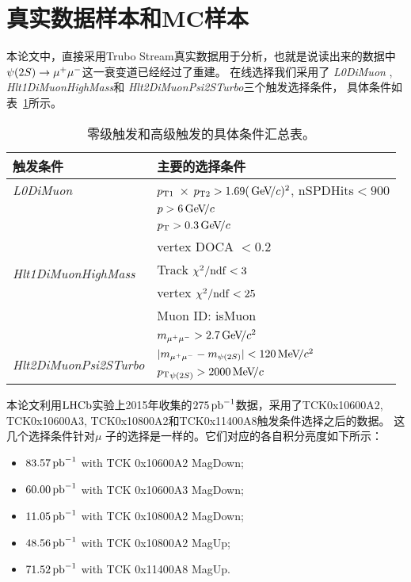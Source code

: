 \section{真实数据样本和MC样本}
本论文中，直接采用Trubo Stream真实数据用于分析，也就是说读出来的数据中${\psi{(2S)}} \rightarrow\mu^{+}\mu^{-}$这一衰变道已经经过了重建。
在线选择我们采用了 {\it L0DiMuon }, {\it Hlt1DiMuonHighMass}和 {\it Hlt2DiMuonPsi2STurbo}三个触发选择条件，
具体条件如表~\ref{tab:trgSummary}所示。
\begin{table}[!ht]
\begin{center}
\caption {零级触发和高级触发的具体条件汇总表。}
\begin{tabular}{l|l}
\hline
触发条件&主要的选择条件\\
\hline
{\it L0DiMuon } &$p_{\rm T1}$ $\times$ $p_{\rm T2} >1.69({\mathrm{\,Ge\kern -0.1em V\!/}c})^2$, nSPDHits$<900$\\
\hline
 \multirow{7}{*}{\it Hlt1DiMuonHighMass}												 & $p >6{\mathrm{\,Ge\kern -0.1em V\!/}c}$\\
                         & $\mbox{$p_{\mathrm{ T}}$} >0.3{\mathrm{\,Ge\kern -0.1em V\!/}c}$\\
                         & vertex DOCA  $<0.2$\\
                         & Track $\chi^2/\mathrm{ndf}<3$\\
												 & vertex $\chi^2/\mathrm{ndf}<25$ \\
												 & Muon ID: isMuon \\
                         & $m_{{\mu^+\mu^-}}>2.7{\mathrm{\,Ge\kern -0.1em V\!/}c^2}$\\
\hline
\multirow{2}{*}{\it Hlt2DiMuonPsi2STurbo}   & $|m_{{\mu^+\mu^-}}-m_{{\psi{(2S)}}}|<120{\mathrm{\,Me\kern -0.1em V\!/}c^2}$\\
                                        & $\mbox{$p_{\mathrm{ T}}$}_{{\psi{(2S)}}}>2000{\mathrm{\,Me\kern -0.1em V\!/}c}$ \\
\hline
\end{tabular}
\label{tab:trgSummary} 
\end{center}
\end{table}

本论文利用$\mbox{LHCb}$实验上2015年收集的$275\mbox{\,pb}^{-1}$数据，采用了TCK0x10600A2, TCK0x10600A3, TCK0x10800A2和TCK0x11400A8触发条件选择之后的数据。
这几个选择条件针对$\mu$ 子的选择是一样的。它们对应的各自积分亮度如下所示：
\begin{itemize} 
\item $83.57\mbox{\,pb}^{-1}$ with TCK 0x10600A2 MagDown;
\item $60.00\mbox{\,pb}^{-1}$ with TCK 0x10600A3 MagDown;
\item $11.05\mbox{\,pb}^{-1}$ with TCK 0x10800A2 MagDown;
\item $48.56\mbox{\,pb}^{-1}$ with TCK 0x10800A2 MagUp;
\item $71.52\mbox{\,pb}^{-1}$ with TCK 0x11400A8 MagUp.
\end{itemize}

